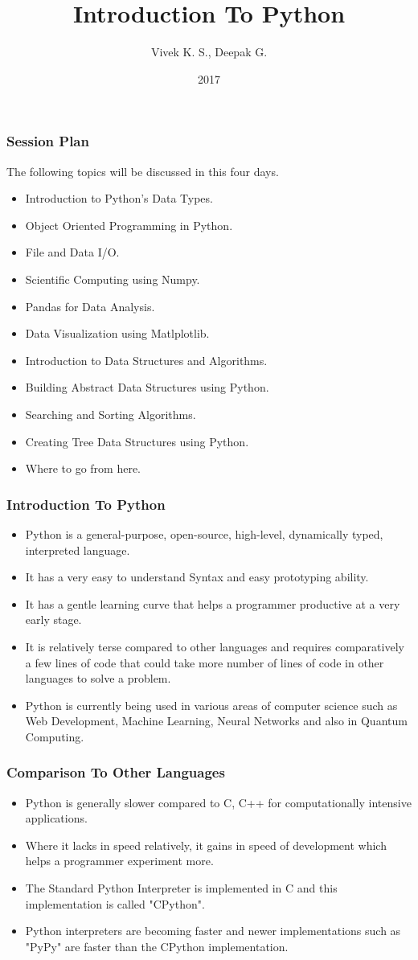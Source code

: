 \documentclass{beamer}
\title{Introduction To Python}
\author{Vivek K. S., Deepak G.}
\institute{Information Systems Decision Sciences (ISDS)\\
MUMA College of Business\\
University of South Florida \\
Tampa, Florida}
\date{2017}
\begin{document}
 
\frame{\titlepage}

\begin{frame}
\frametitle{Session Plan}
The following topics will be discussed in this four days.
\begin{itemize}
\item Introduction to Python's Data Types.
\item Object Oriented Programming in Python.
\item File and Data I/O.
\item Scientific Computing using Numpy. 
\item Pandas for Data Analysis.
\item Data Visualization using Matlplotlib.
\item Introduction to Data Structures and Algorithms.
\item Building Abstract Data Structures using Python.
\item Searching and Sorting Algorithms.
\item Creating Tree Data Structures using Python.
\item Where to go from here. 
\end{itemize}
\end{frame}
 
\begin{frame}
\frametitle{Introduction To Python}
\begin{itemize}
\item Python is a general-purpose, open-source, high-level, dynamically typed, interpreted language.
\item It has a very easy to understand Syntax and easy prototyping ability.
\item It has a gentle learning curve that helps a  programmer productive at a very early stage.
\item It is relatively terse compared to other languages and requires comparatively  a few lines of code that could take more number of lines of code in other languages to solve a problem.
\item Python is currently being used in various areas of computer science such as Web Development, Machine Learning, Neural Networks and also in Quantum Computing.
\end{itemize}
\end{frame}

\begin{frame}
\frametitle{Comparison To Other Languages}
\begin{itemize}
\item Python is generally slower compared to C, C++ for computationally intensive applications.
\item Where it lacks in speed relatively, it gains in speed of development which helps a programmer experiment more.
\item The Standard Python Interpreter is implemented in C and this implementation is called "CPython".
\item Python interpreters are becoming faster and newer implementations such as "PyPy" are faster than the CPython implementation.
\end{itemize}
\end{frame}
\end{document}

